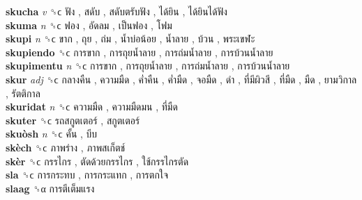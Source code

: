 \textbf{skucha} \emph{v}  ␝ϲ   ฟัง ,  สดับ ,  สดับตรับฟัง ,  ได้ยิน ,  ได้ยินได้ฟัง   \\
\textbf{skuma} \emph{n}  ␝ϲ   ฟอง ,  อัดลม ,  เป็นฟอง ,  โฟม   \\
\textbf{skupi} \emph{n}  ␝ϲ   ขาก ,  ถุย ,  ถ่ม ,  น้ำบ่อน้อย ,  น้ำลาย ,  บ้วน ,  พระเขฬะ   \\
\textbf{skupiendo} ␝ϲ   การขาก ,  การถุยน้ำลาย ,  การถ่มน้ำลาย ,  การบ้วนน้ำลาย   \\
\textbf{skupimentu} \emph{n}  ␝ϲ   การขาก ,  การถุยน้ำลาย ,  การถ่มน้ำลาย ,  การบ้วนน้ำลาย   \\
\textbf{skur} \emph{adj}  ␝ϲ   กลางคืน ,  ความมืด ,  ค่ำคืน ,  ค่ำมืด ,  จอมืด ,  ดำ ,  ที่มีผิวสี ,  ที่มืด ,  มืด ,  ยามวิกาล ,  รัตติกาล   \\
\textbf{skuridat} \emph{n}  ␝ϲ   ความมืด ,  ความมืดมน ,  ที่มืด   \\
\textbf{skuter} ␝ϲ   รถสกูตเตอร์ ,  สกูตเตอร์   \\
\textbf{skuòsh} \emph{n}  ␝ϲ   คั้น ,  บีบ   \\
\textbf{skèch} ␝ϲ   ภาพร่าง ,  ภาพสเก็ตช์   \\
\textbf{skèr} ␝ϲ   กรรไกร ,  ตัดด้วยกรรไกร ,  ใช้กรรไกรตัด   \\
\textbf{sla} ␝ϲ   การกระทบ ,  การกระแทก ,  การตกใจ   \\
\textbf{slaag} ␝α   การตีเต็มแรง   \\
